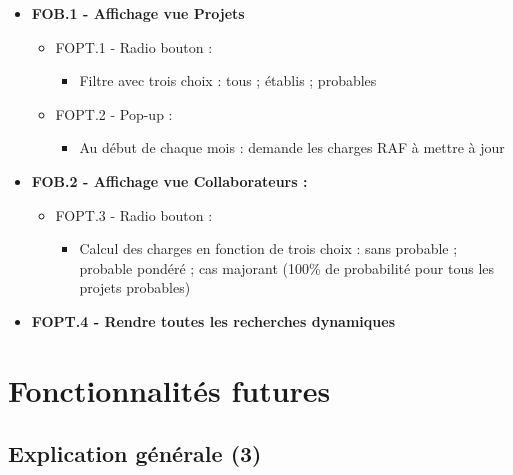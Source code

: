 \documentclass[french]{report}
\begin{document}
\begin{itemize}[label=\textbullet, font=\normalfont \color{blue}]
  \item{\textbf{FOB.1 - Affichage vue Projets}}

  \begin{itemize}[label=\textbullet]
    \item{FOPT.1 - Radio bouton : }

    \begin{itemize}[label=-]
      \item{Filtre avec trois choix : tous ; établis ; probables}
    \end{itemize}

    \item{FOPT.2 - Pop-up :}

    \begin{itemize}[label=-]
      \item{Au début de chaque mois : demande les charges RAF à mettre à jour}
    \end{itemize}

  \end{itemize}

  \item{\textbf{FOB.2 - Affichage vue Collaborateurs : }}

  \begin{itemize}[label=\textbullet]
    \item{FOPT.3 - Radio bouton :}

    \begin{itemize}[label=-]
      \item{Calcul des charges en fonction de trois choix : sans probable ;
       probable pondéré ; cas majorant (100\% de probabilité pour tous les
       projets probables)}
    \end{itemize}

  \end{itemize}

  \item{\textbf{FOPT.4 - Rendre toutes les recherches dynamiques}}

\end{itemize}

\newpage

  \section{Fonctionnalités futures}

\subsection{Explication générale (3)}
\end{document}
